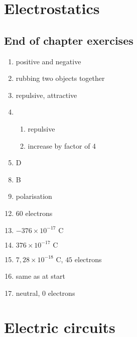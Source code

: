 \section{Electrostatics}
\subsection{End of chapter exercises}
\begin{multicols}{3}
 \begin{enumerate}[noitemsep, label=\textbf{(\arabic*)} ]
\item positive and negative
\item rubbing two objects together
\item repulsive, attractive
\item 
 \begin{enumerate}[noitemsep, label=\textbf{(\alph*)} ]
\item repulsive
\item increase by factor of 4
 \end{enumerate}
\item D
 \end{enumerate}
\begin{enumerate}[noitemsep, label=\textbf{(\arabic*)} ]
\setcounter{enumi}{7}
 \item B
\item polarisation
\end{enumerate}
\begin{enumerate}[noitemsep, label=\textbf{(\arabic*)} ]
\setcounter{enumi}{11}
 \item $60$ electrons
\item $-376 \times 10^{-17} \text{ C}$
\item $376 \times 10^{-17} \text{ C}$
\item $7,28 \times 10^{-18} \text{ C}$, $45$ electrons
\item same as at start
\item neutral, $0$ electrons
\end{enumerate}
\end{multicols}

\section{Electric circuits}

